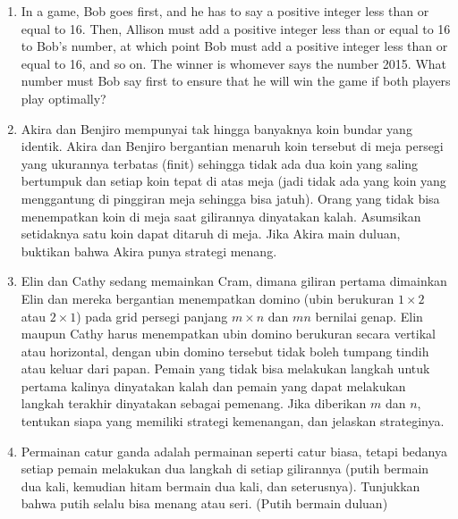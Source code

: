 \documentclass[12pt]{scrartcl}
\begin{document}
\begin{enumerate}[resume]
    Let $ n \ge 2 $ be the largest positive integer $ \le 200 $ such that if Alice and Bob play the divisor game for $ n $ and both of them play optimally, the second player wins. Find $ n $. If no such $ n $ exists, enter $ 999 $.

    \item In a game, Bob goes first, and he has to say a positive integer less than or equal to 16. Then, Allison must add a positive integer less than or equal to 16 to Bob’s number, at which point Bob must add a positive integer less than or equal to 16, and so on. The winner is whomever says the number 2015. What number must Bob say first to ensure that he will win the game if both players play optimally?
    
\item Akira dan Benjiro mempunyai tak hingga banyaknya koin bundar yang identik. Akira dan Benjiro bergantian menaruh koin tersebut di meja persegi yang ukurannya terbatas (finit) sehingga tidak ada dua koin yang saling bertumpuk dan setiap koin tepat di atas meja (jadi tidak ada yang koin yang menggantung di pinggiran meja sehingga bisa jatuh). Orang yang tidak bisa menempatkan koin di meja saat gilirannya dinyatakan kalah. Asumsikan setidaknya satu koin dapat ditaruh di meja. Jika Akira main duluan, buktikan bahwa Akira punya strategi menang.


\item Elin dan Cathy sedang memainkan Cram, dimana giliran pertama dimainkan Elin dan mereka bergantian menempatkan domino (ubin berukuran $1 \times 2$ atau $2 \times 1$) pada grid persegi panjang $m \times n$ dan $mn$ bernilai genap. Elin maupun Cathy harus menempatkan ubin domino berukuran secara vertikal atau horizontal, dengan ubin domino tersebut tidak boleh tumpang tindih atau keluar dari papan. Pemain yang tidak bisa melakukan langkah untuk pertama kalinya dinyatakan kalah dan pemain yang dapat melakukan langkah terakhir dinyatakan sebagai pemenang. Jika diberikan $m$ dan $n$, tentukan siapa yang memiliki strategi kemenangan, dan jelaskan strateginya.


\item Permainan catur ganda adalah permainan seperti catur biasa, tetapi bedanya setiap pemain melakukan dua langkah di setiap gilirannya (putih bermain dua kali, kemudian hitam bermain dua kali, dan seterusnya). Tunjukkan bahwa putih selalu bisa menang atau seri. (Putih bermain duluan)





\end{enumerate}
\end{document}
